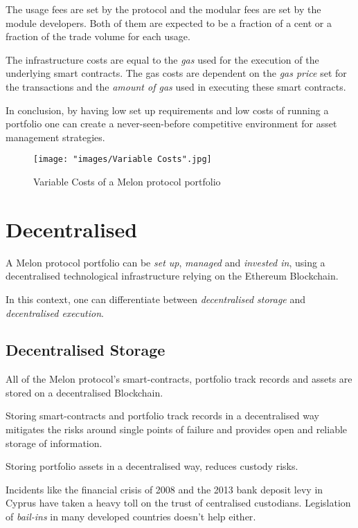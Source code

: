 \documentclass[9pt,oneside]{amsart}
\theoremstyle{plain}
\begin{document}
\begin{multicols}{2}
    The usage fees are set by the protocol and the modular fees are set by the module developers. Both of them are expected to be a fraction of a cent or a fraction of the trade volume for each usage.
    
    The infrastructure costs are equal to the \textit{gas} used for the execution of the underlying smart contracts. The gas costs are dependent on the \textit{gas price} set for the transactions and the \textit{amount of gas} used in executing these smart contracts\cite{yellow}.
    
    In conclusion, by having low set up requirements and low costs of running a portfolio one can create a never-seen-before competitive environment for asset management strategies.
    
    \begin{figure*}[ht!]
        \centering
        \texttt{[image: "images/Variable Costs".jpg]}
        \caption{Variable Costs of a Melon protocol portfolio}
        \label{fig:fees}
    \end{figure*}
    
    \section{Decentralised}\label{sec:decentralised}
    
    A Melon protocol portfolio can be \textit{set up}, \textit{managed} and \textit{invested in}, using a decentralised technological infrastructure relying on the Ethereum Blockchain.
    
    In this context, one can differentiate between \textit{decentralised storage} and \textit{decentralised execution}.
    
    \subsection{Decentralised Storage}
    
    All of the Melon protocol's smart-contracts, portfolio track records and assets are stored on a decentralised Blockchain. 
    
    Storing smart-contracts and portfolio track records in a decentralised way mitigates the risks around single points of failure and provides open and reliable storage of information.
    
    Storing portfolio assets in a decentralised way, reduces custody risks.
    
    Incidents like the financial crisis of 2008 and the 2013 bank deposit levy in Cyprus have taken a heavy toll on the trust of centralised custodians. Legislation of \textit{bail-ins} in many developed countries doesn't help either\cite{bailinsch}\cite{bailinseu}.
    

\end{multicols}
\end{document}
